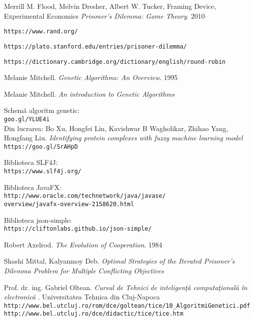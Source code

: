 \begin{thebibliography}{99}

Merrill M. Flood, Melvin Dresher, Albert W. Tucker, Framing Device, Experimental Economics
\textit{Prisoner's Dilemma: Game Theory}. 2010

\texttt{https://www.rand.org/}

\texttt{https://plato.stanford.edu/entries/prisoner-dilemma/}

\texttt{https://dictionary.cambridge.org/dictionary/english/round-robin}

Melanie Mitchell. 
\textit{Genetic Algorithms: An Overview}. 1995

Melanie Mitchell.
\textit{An introduction to Genetic Algorithms}

Schemă algoritm genetic:
\\\texttt{goo.gl/YLUE4i}\\
Din lucrarea: Bo Xu, Hongfei Lin, Kavishwar B Wagholikar, Zhihao Yang, Hongfang Liu. \textit{Identifying protein complexes with fuzzy machine learning model}
\\\texttt{https://goo.gl/SrAHpD} 

Biblioteca SLF4J:\\
\texttt{https://www.slf4j.org/}

Biblioteca JavaFX:\\
\texttt{http://www.oracle.com/technetwork/java/javase/}\\
\texttt{overview/javafx-overview-2158620.html}

Biblioteca json-simple:\\
\texttt{https://cliftonlabs.github.io/json-simple/}

Robert Axelrod.
\textit{The Evolution of Cooperation}. 1984

Shashi Mittal, Kalyanmoy Deb.
\textit{Optimal Strategies of the Iterated Prisoner’s Dilemma Problem for
	Multiple Conflicting Objectives}

Prof. dr. ing. Gabriel Oltean.
\textit{Cursul de Tehnici de inteligenţă computaţională în electronică}
. Universitatea Tehnica din Cluj-Napoca
\\\texttt{http://www.bel.utcluj.ro/rom/dce/goltean/tice/10\_AlgoritmiGenetici.pdf}
\\\texttt{http://www.bel.utcluj.ro/dce/didactic/tice/tice.htm}


\end{thebibliography}

